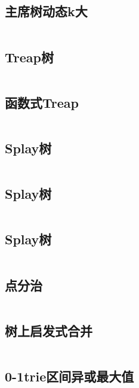 \inputminted{cpp}{code/chairmantree.cc}

\subsection{主席树动态k大} 

\inputminted{cpp}{code/BITchairmanTree.cc}

\subsection{Treap树} 

\inputminted{cpp}{code/treap.cc}

\subsection{函数式Treap} 

\inputminted{cpp}{code/fhq_treap.cc}

\subsection{Splay树} 

\inputminted{cpp}{code/splay.cc}

\subsection{Splay树} 

\inputminted{cpp}{code/splay2.cc}

\subsection{Splay树} 

\inputminted{cpp}{code/splayTree.cc}

\subsection{点分治} 

\inputminted{cpp}{code/pointDC.cc}

\subsection{树上启发式合并} 

\inputminted{cpp}{code/dsu_on_tree.cc}

\subsection{0-1trie区间异或最大值} 

